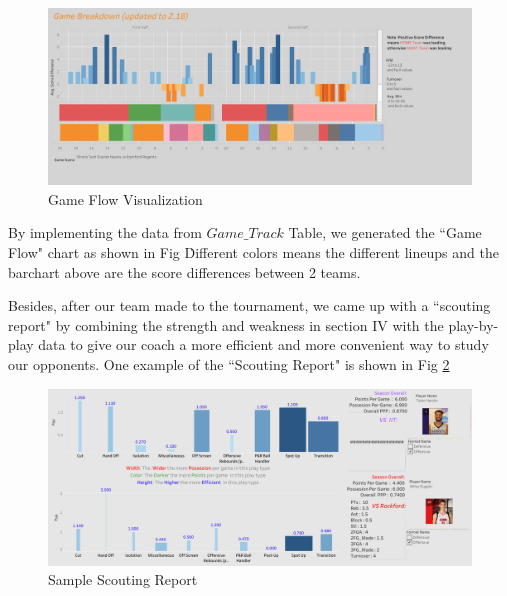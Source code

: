 \documentclass[conference]{IEEEtran}
\begin{document}
\begin{figure}[h!]
  \includegraphics[width=\linewidth]{gameflow.jpg}
  \caption{Game Flow Visualization}
  \vspace{-1mm}
  \label{fig:gameflow}
\end{figure}
By implementing the data from $Game\_Track$ Table, we generated the ``Game Flow" chart as shown in Fig \. Different colors means the different lineups and the barchart above are the score differences between 2 teams.

Besides, after our team made to the tournament, we came up with a ``scouting report" by combining the strength and weakness in section IV with the play-by-play data to give our coach a more efficient and more convenient way to study our opponents. One example of the ``Scouting Report" is shown in Fig \ref{fig:scouting}
\begin{figure}[h!]
  \includegraphics[width=\linewidth]{scouting.jpg}
  \caption{Sample Scouting Report}
  \vspace{-1mm}
  \label{fig:scouting}
\end{figure}

\clearpage


\end{document}
